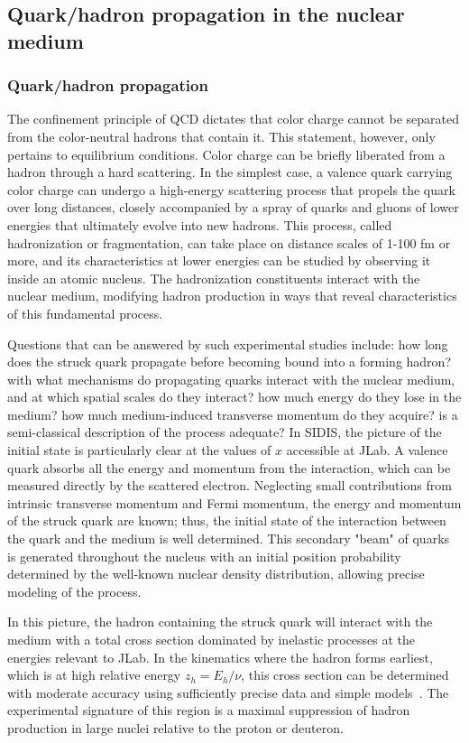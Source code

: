 \subsection{Quark/hadron propagation in the nuclear medium}

\subsubsection{Quark/hadron propagation}
The confinement principle of QCD dictates that color charge cannot be separated from the color-neutral hadrons that contain it. This statement, however, only pertains to equilibrium conditions. Color charge can be briefly liberated from a hadron through a hard scattering. In the simplest case, a valence quark carrying color charge can undergo a high-energy scattering process that propels the quark over long distances, closely accompanied by a spray of quarks and gluons of lower energies that ultimately evolve into new hadrons. This process, called hadronization or fragmentation, can take place on distance scales of 1-100 fm or more, and its characteristics at lower energies can be studied by observing it inside an atomic nucleus. The hadronization constituents interact with the nuclear medium, modifying hadron production in ways that reveal characteristics of this fundamental process. 

Questions that can be answered by such experimental studies include: how long does the struck quark propagate before becoming bound into a forming hadron? with what mechanisms do propagating quarks interact with the nuclear medium, and at which spatial scales do they interact? how much energy do they lose in the medium? how much medium-induced transverse momentum do they acquire? is a semi-classical description of the process adequate? In SIDIS, the picture of the initial state is particularly clear at the values of $x$ accessible at JLab. A valence quark absorbs all the energy and momentum from the interaction, which can be measured directly by the scattered electron. Neglecting small contributions from intrinsic transverse momentum and Fermi momentum, the energy and momentum of the struck quark are known; thus, the initial state of the interaction between the quark and the medium is well determined. This secondary "beam" of quarks is generated throughout the nucleus with an initial position probability determined by the well-known nuclear density distribution, allowing precise modeling of the process.

In this picture, the hadron containing the struck quark will interact with the medium with a total cross section dominated by inelastic processes at the energies relevant to JLab. In the kinematics where the hadron forms earliest, which is at high relative energy $z_h=E_h/\nu$, this cross section can be determined with moderate accuracy using sufficiently precise data and simple models~\cite{BROOKS2021136171}. The experimental signature of this region is a maximal suppression of hadron production in large nuclei relative to the proton or deuteron.

